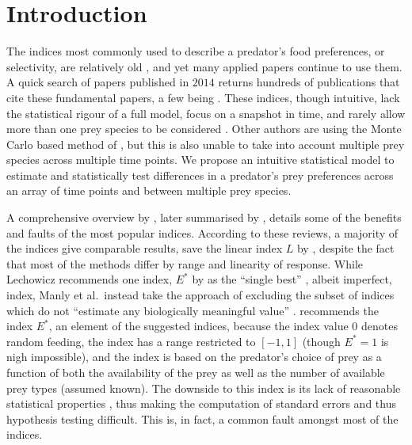 \documentclass[smallextended]{svjour3}
\begin{document}

\section{Introduction}
\label{intro}

The indices most commonly used to describe a predator's food preferences, or selectivity, are relatively old \citep{Ivlev:1964,Jacobs:1974,Chesson:1978,Strauss:1979,Vanderploeg:1979,Chesson:1983}, and yet many applied papers continue to use them.  A quick search of papers published in $2014$ returns hundreds of publications that cite these fundamental papers, a few being \citet{Clements:2014,Hansen:2014,Hellstrom:2014,Lyngdoh:2014,Madduppa:2014}.  These indices, though intuitive, lack the statistical rigour of a full model, focus on a snapshot in time, and rarely allow more than one prey species to be considered \citep{Lechowicz:1982}.  Other authors are using the Monte Carlo based method of \citet{Agusti:2003} \citep[see][]{Davey:2013,King:2010}, but this is also unable to take into account multiple prey species across multiple time points.  We propose an intuitive statistical model to estimate and statistically test differences in a predator's prey preferences across an array of time points and between multiple prey species.   

A comprehensive overview by \citet{Lechowicz:1982}, later summarised by \citet{Manly:2002}, details some of the benefits and faults of the most popular indices.  According to these reviews, a majority of the indices give comparable results, save the linear index $L$ by \citet{Strauss:1979}, despite the fact that most of the methods differ by range and linearity of response.  While Lechowicz recommends one index, $E^*$ by \citet{Vanderploeg:1979} as the ``single best'' \citep{Lechowicz:1982}, albeit imperfect, index, Manly et al.\ instead take the approach of excluding the subset of indices which do not ``estimate any biologically meaningful value'' \citep{Manly:2002}.  \citet{Lechowicz:1982} recommends the index $E^*$, an element of the \citet{Manly:2002} suggested indices, because the index value $0$ denotes random feeding, the index has a range restricted to $[-1,1]$ (though $E^*=1$ is nigh impossible), and the index is based on the predator's choice of prey as a function of both the availability of the prey as well as the number of available prey types (assumed known).  The downside to this index is its lack of reasonable statistical properties \citep{Lechowicz:1982}, thus making the computation of standard errors and thus hypothesis testing difficult.  This is, in fact, a common fault amongst most of the indices.  
\end{document}
